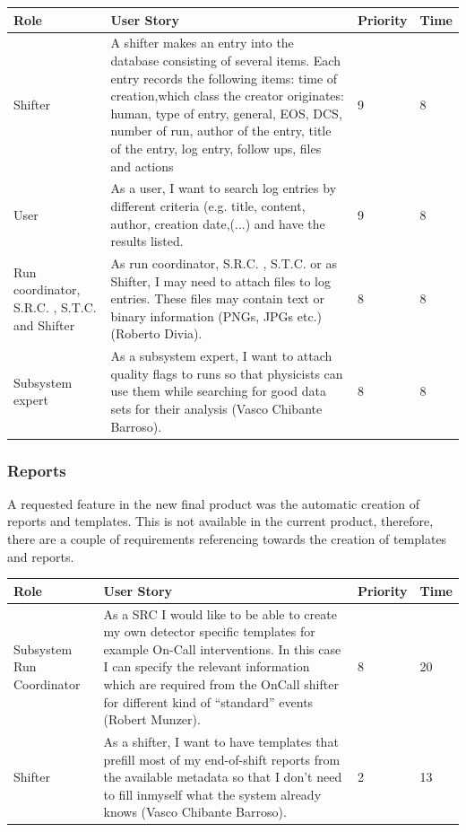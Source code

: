 \documentclass[paper=a4, fontsize=11pt,twoside]{scrartcl}	%
\begin{document}
\begin{longtable}{ | p{3cm} | p{8cm} | p{1cm} | l |}
\hline
Role & User Story & Priority & Time \\ \hline
Shifter &  A shifter makes an entry into the database consisting of several items. Each entry records the following items: time of creation,which class the creator originates: human, type of entry, general, EOS, DCS, number of run, author of the entry, title of the entry, log entry, follow ups, files and actions & 9 & 8 \\ \hline
User & As a user, I want to search log entries by different criteria (e.g. title, content, author, creation date,(...) and have the results listed. & 9 & 8 \\ \hline
Run coordinator, S.R.C. , S.T.C. and Shifter& As run coordinator, S.R.C. , S.T.C. or as Shifter, I may need to attach files to log entries. These files may contain text or binary information (PNGs, JPGs etc.) (Roberto Divia). & 8 & 8 \\ \hline
Subsystem expert & As a subsystem expert, I want to attach quality flags to runs so that
physicists can use them while searching for good data sets for their analysis (Vasco Chibante Barroso). & 8 & 8 \\ \hline
\end{longtable}


\subsubsection{Reports}
A requested feature in the new final product was the automatic creation of reports and templates. This is not available in the current product, therefore, there are a couple of requirements referencing towards the creation of templates and reports.
\begin{longtable}{ | p{3cm} | p{8cm} | p{1cm} | l |}
\hline
Role & User Story & Priority & Time \\ \hline
Subsystem Run Coordinator & As a SRC I would like to be able to create my own detector specific templates for example On-Call interventions. In this case I can specify the relevant information which are required from the OnCall shifter for different kind of “standard” events (Robert Munzer). & 8 & 20 \\ \hline
Shifter &  As a shifter, I want to have templates that prefill most of my end-of-shift reports from the available metadata so that I don’t need to fill inmyself what the system already knows (Vasco Chibante Barroso). & 2 & 13 \\ \hline
\end{longtable}
\end{document}
